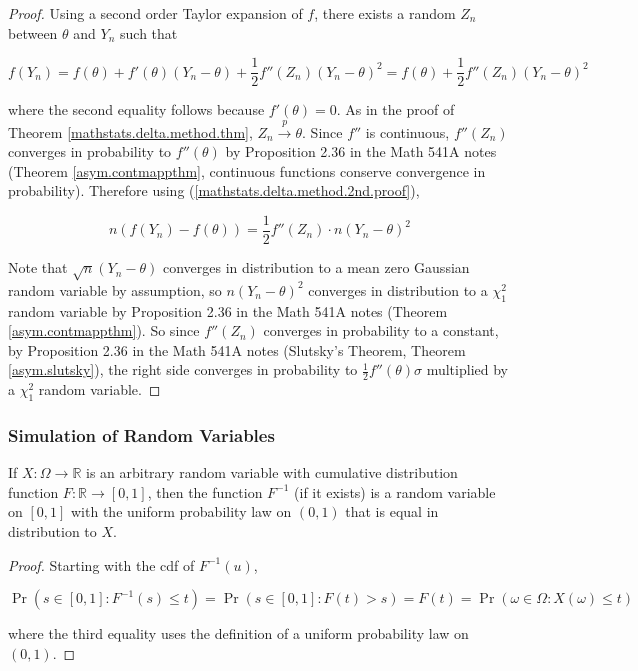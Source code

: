 \begin{proof} Using a second order Taylor expansion of \(f\), there exists a random \(Z_n\) between \(\theta\) and \(Y_n\) such that

\begin{equation}\label{mathstats.delta.method.2nd.proof}
f(Y_n) = f(\theta) + f'(\theta)(Y_n - \theta) + \frac{1}{2} f''(Z_n)(Y_n - \theta)^2 = f(\theta) + \frac{1}{2} f''(Z_n)(Y_n - \theta)^2
\end{equation}

where the second equality follows because \(f'(\theta)=0\). As in the proof of Theorem \ref{mathstats.delta.method.thm}, \(Z_n \xrightarrow{p} \theta\). Since \(f''\) is continuous, \(f''(Z_n)\) converges in probability to \(f''(\theta)\) by Proposition 2.36 in the Math 541A notes (Theorem \ref{asym.contmappthm}, continuous functions conserve convergence in probability). Therefore using (\ref{mathstats.delta.method.2nd.proof}),

\[
n(f(Y_n) - f(\theta)) = \frac{1}{2} f''(Z_n) \cdot n(Y_n - \theta)^2
\]

Note that \(\sqrt{n} (Y_n - \theta)\) converges in distribution to a mean zero Gaussian random variable by assumption, so \( n(Y_n - \theta)^2\) converges in distribution to a \(\chi_1^2\) random variable by Proposition 2.36 in the Math 541A notes (Theorem \ref{asym.contmappthm}). So since \(f''(Z_n)\) converges in probability to a constant, by Proposition 2.36 in the Math 541A notes (Slutsky's Theorem, Theorem \ref{asym.slutsky}), the right side converges in probability to \(\frac{1}{2} f''(\theta) \sigma\) multiplied by a \(\chi_1^2\) random variable.

\end{proof}

\subsubsection{Simulation of Random Variables}

\begin{proposition} If \(X: \Omega \to \mathbb{R}\) is an arbitrary random variable with cumulative distribution function \(F: \mathbb{R} \to [0,1]\), then the function \(F^{-1}\) (if it exists) is a random variable on \([0,1]\) with the uniform probability law on \((0,1)\) that is equal in distribution to \(X\).

\end{proposition}

\begin{proof} Starting with the cdf of \(F^{-1}(u)\),

\[
\Pr(s \in [0,1]: F^{-1}(s) \leq t) = \Pr(s \in [0,1]: F(t) > s) = F(t) = \Pr( \omega \in \Omega: X(\omega) \leq t)
\]

where the third equality uses the definition of a uniform probability law on \((0,1)\).

\end{proof}

